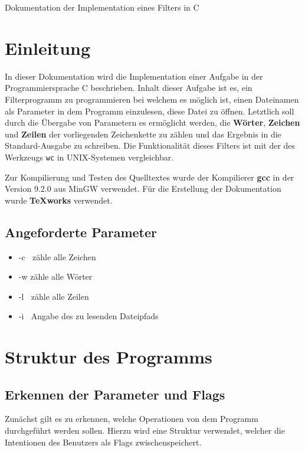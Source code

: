 \documentclass[10pt,a4paper]{article}
\newcommand{\Title}[1]{\begin{center}\begin{LARGE}#1\vspace{8pt}\end{LARGE}\end{center}}
\begin{document}
\begin{spacing}{1}

\Title{Dokumentation der Implementation eines Filters in C}


\section{Einleitung}

In dieser Dokumentation wird die Implementation einer Aufgabe in der Programmiersprache C beschrieben. Inhalt dieser Aufgabe ist es, ein Filterprogramm zu
programmieren bei welchem es möglich ist, einen Dateinamen als Parameter in dem Programm einzulesen, diese Datei zu öffnen. Letztlich soll durch die Übergabe von Parametern es ermöglicht werden, die \textbf{Wörter}, \textbf{Zeichen} und \textbf{Zeilen}  der vorliegenden Zeichenkette zu zählen und das Ergebnis in die Standard-Ausgabe zu schreiben. Die Funktionalität dieses Filters ist
mit der des Werkzeugs \texttt{wc} in UNIX-Systemen vergleichbar.

Zur Kompilierung und Testen des Quelltextes wurde der Kompilierer \textbf{gcc} in der Version 9.2.0 aus MinGW verwendet. Für die Erstellung der Dokumentation wurde \textbf{TeXworks} verwendet.

\subsection{Angeforderte Parameter}

\begin{itemize}
\item -c \quad $\>$ zähle alle Zeichen
\item -w \quad zähle alle Wörter
\item -l \quad $\>$ zähle alle Zeilen
\item -i \quad $\>$ Angabe des zu lesenden Dateipfads
\end{itemize}

\section{Struktur des Programms}
\subsection{Erkennen der Parameter und Flags}

Zunächst gilt es zu erkennen, welche Operationen von dem Programm durchgeführt werden sollen. Hierzu wird eine Struktur verwendet, welcher die Intentionen des Benutzers als Flags zwischenspeichert.


\end{spacing}
\end{document}
